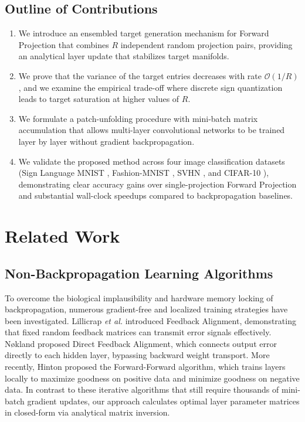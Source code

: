 \documentclass[journal]{IEEEtran}
\begin{document}
\subsection{Outline of Contributions}
\begin{enumerate}
    \item We introduce an ensembled target generation mechanism for Forward Projection that combines $R$ independent random projection pairs, providing an analytical layer update that stabilizes target manifolds.
    \item We prove that the variance of the target entries decreases with rate $\mathcal{O}(1/R)$, and we examine the empirical trade-off where discrete sign quantization leads to target saturation at higher values of $R$.
    \item We formulate a patch-unfolding procedure with mini-batch matrix accumulation that allows multi-layer convolutional networks to be trained layer by layer without gradient backpropagation.
    \item We validate the proposed method across four image classification datasets (Sign Language MNIST \cite{kaggle_sign_mnist}, Fashion-MNIST \cite{xiao2017fashion}, SVHN \cite{netzer2011reading}, and CIFAR-10 \cite{krizhevsky2009learning}), demonstrating clear accuracy gains over single-projection Forward Projection and substantial wall-clock speedups compared to backpropagation baselines.
\end{enumerate}

\section{Related Work}

\subsection{Non-Backpropagation Learning Algorithms}
To overcome the biological implausibility and hardware memory locking of backpropagation, numerous gradient-free and localized training strategies have been investigated. Lillicrap \emph{et al.} \cite{lillicrap2016random} introduced Feedback Alignment, demonstrating that fixed random feedback matrices can transmit error signals effectively. N{\o}kland \cite{nokland2016direct} proposed Direct Feedback Alignment, which connects output error directly to each hidden layer, bypassing backward weight transport. More recently, Hinton \cite{hinton2022forward} proposed the Forward-Forward algorithm, which trains layers locally to maximize goodness on positive data and minimize goodness on negative data. In contrast to these iterative algorithms that still require thousands of mini-batch gradient updates, our approach calculates optimal layer parameter matrices in closed-form via analytical matrix inversion.
\end{document}
